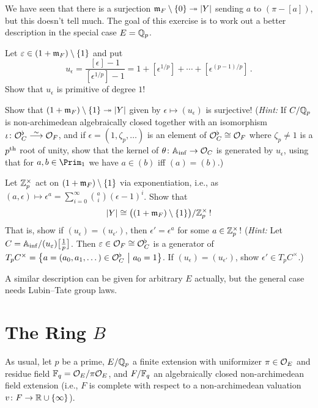 \begin{exc}
	We have seen that there is a surjection $\mm_F\setminus\{0\}\epimorphism |Y|$ sending $a$ to $(\pi-[a])$, but this doesn't tell much. The goal of this exercise is to work out a better description in the special case $E=\mathbb{Q}_p$.
	\begin{numerate}
		\item Let $\varepsilon\in (1+\mathfrak{m}_F)\setminus\{1\}$ and put
		\begin{equation*}
			u_\epsilon=\frac{[\epsilon]-1}{[\epsilon^{1/p}]-1}=1+[\epsilon^{1/p}]+\dotsb+[\epsilon^{(p-1)/p}]\,.
		\end{equation*}
		Show that $u_\epsilon$ is primitive of degree $1$!
		\item Show that $(1+\mm_F)\setminus\{1\}\epimorphism |Y|$ given by $\epsilon\mapsto (u_\epsilon)$ is surjective!	{\footnotesize(\emph{Hint:} If $C/\mathbb{Q}_p$ is non-archimedean algebraically closed  together with an isomorphism $\iota\colon \Oo_C^\flat\isomorphism \Oo_F$, and if $\epsilon=(1,\zeta_p,\dotsc)$ is an element of $\mathcal{O}_C^\flat\cong \mathcal{O}_F$ where $\zeta_p\neq 1$ is a $p^{\text{th}}$ root of unity, show that the kernel of $\theta\colon \IA_\inf\morphism \Oo_C$ is generated by $u_\epsilon$, using that for $a,b\in\Prim_1$ we have $a\in(b)$ iff $(a)=(b)$.)}
		\item Let $\mathbb{Z}_p^\times$ act on $(1+\mathfrak{m}_F)\setminus\{1\}$ via exponentiation, i.e., as $(a,\epsilon)\mapsto \epsilon^a=\sum_{i=0}^\infty \binom{a}{i}(\epsilon-1)^i$. Show that
		\begin{equation*}
			|Y|\cong \big((1+\mathfrak{m}_F)\setminus\{1\}\big)/\mathbb{Z}_p^\times\,!
		\end{equation*}
		That is, show if $(u_\epsilon)=(u_{\epsilon'})$, then $\epsilon'=\epsilon^a$ for some $a\in \mathbb{Z}_p^\times$! {(\footnotesize\emph{Hint:} Let $C=\mathbb{A}_{\mathrm{inf}}/(u_\varepsilon)\big[\frac 1p\big]$. Then $\varepsilon\in\mathcal{O}_F\cong \mathcal{O}_C^\flat$ is a generator of $T_pC^\times=\left\{a=(a_0,a_1,\dotsc)\in\mathcal{O}_C^\flat\ \middle|\  a_0=1\right\}$. If $(u_\epsilon)=(u_{\epsilon'})$, show $\epsilon'\in T_pC^\times$.)} 
	\end{numerate}
	 A similar description can be given for arbitrary $E$  actually, but the general case needs Lubin--Tate group laws.
\end{exc}

\section{The Ring \texorpdfstring{$B$}{B}}
As usual, let $p$ be a prime, $E/\mathbb{Q}_p$ a finite extension with uniformizer $\pi\in\mathcal{O}_E$ and residue field $\mathbb{F}_q=\mathcal{O}_E/\pi \mathcal{O}_E$, and $F/\mathbb{F}_q$ an algebraically closed non-archimedean field extension (i.e., $F$ is complete with respect to a non-archimedean valuation $v\colon F\morphism \IR\cup\{\infty\}$).

